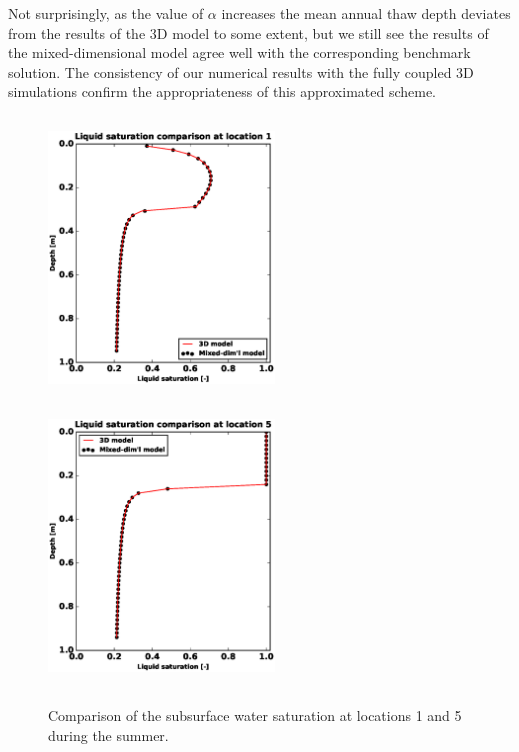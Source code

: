 \documentclass[review]{elsarticle}
\begin{document}
Not surprisingly, as the value of $\alpha$ increases the mean annual thaw depth deviates from the results of the 3D model to some extent, but we still see the results of the mixed-dimensional model agree well with the corresponding benchmark solution. The consistency of our numerical results with the fully coupled 3D simulations confirm the appropriateness of this approximated scheme. 






 \begin{figure}[!htpb]
\centering
\includegraphics[height = 7.5cm, width=6cm]{figures/comparison/regular/ss-sat/comp-sat-loc1-cycle0020.eps}
\includegraphics[height = 7.5cm, width=6cm]{figures/comparison/regular/ss-sat/comp-sat-loc5-cycle0020.eps}
\caption{Comparison of the subsurface water saturation at locations 1 and 5 during the summer.}
\label{ss-sat-comp}
\end{figure}
\end{document}
